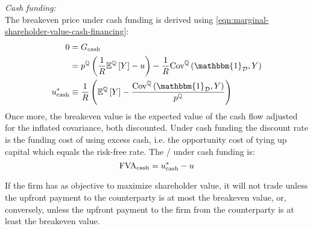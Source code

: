 \documentclass[../main.tex]{subfiles}
\begin{document}
            \textit{Cash funding:} \\
            The breakeven price under cash funding is derived using
            \cref{eqn:marginal-shareholder-value-cash-financing}:
                \begin{align}
                    0 &= G_{\text{cash}} 
                        \nonumber \\
                    &=
                        p^{\mathbb{Q}} \left(
                            \discountfactor
                            \mathbb{E}^{\mathbb{Q}}\left[Y\right]
                            - u
                        \right)
                        -
                        \discountfactor
                        \text{Cov}^{\mathbb{Q}}\left(\mathbbm{1}_{\mathcal{D}}, Y\right) 
                        \nonumber \\
                    u_{\text{cash}}^{\ast}
                    &\equiv
                        \discountfactor
                        \left(
                            \mathbb{E}^{\mathbb{Q}}\left[Y\right]
                            -
                            \frac{
                                \text{Cov}^{\mathbb{Q}}\left(\mathbbm{1}_{\mathcal{D}}, Y\right)
                            }{
                                p^{\mathbb{Q}}  
                            }  
                        \right)
                    \label{eqn:shareholdes-breakeven-cash-financing}
                \end{align}
            Once more, the breakeven value is the expected value of the cash flow
            adjusted for the inflated covariance, both discounted. 
            Under cash funding the discount rate is the funding cost of using excess cash,
            i.e. the opportunity cost of tying up capital which equals the risk-free rate.
            The \FVA/ under cash funding is:
                \begin{equation}
                    \FVA/_{\text{cash}} 
                        = u^{\ast}_{\text{cash}} - u
                    \label{eqn:fva-cash-financing}
                \end{equation}

            If the firm has as objective to maximize shareholder value, 
            it will not trade unless the upfront payment to the counterparty is at most the breakeven value,
            or, conversely, unless the upfront payment to the firm from the counterparty is at least the breakeven value.
\end{document}
